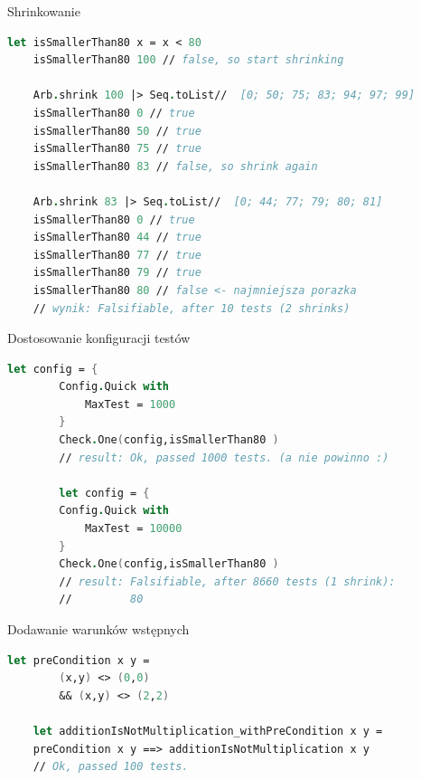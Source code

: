     \begin{frame}[fragile]{Shrinkowanie}
        \begin{lstlisting}[language=FSharp, xleftmargin=-10pt,xrightmargin=-10pt,numbers=none,basicstyle=\ttfamily\small]
    let isSmallerThan80 x = x < 80
    isSmallerThan80 100 // false, so start shrinking

    Arb.shrink 100 |> Seq.toList//  [0; 50; 75; 83; 94; 97; 99]
    isSmallerThan80 0 // true
    isSmallerThan80 50 // true
    isSmallerThan80 75 // true
    isSmallerThan80 83 // false, so shrink again

    Arb.shrink 83 |> Seq.toList//  [0; 44; 77; 79; 80; 81]
    isSmallerThan80 0 // true
    isSmallerThan80 44 // true
    isSmallerThan80 77 // true
    isSmallerThan80 79 // true
    isSmallerThan80 80 // false <- najmniejsza porazka
    // wynik: Falsifiable, after 10 tests (2 shrinks)
        \end{lstlisting}
    \end{frame}
    
    \begin{frame}[fragile]{Dostosowanie konfiguracji testów}
    \begin{lstlisting}[language=FSharp, xleftmargin=-10pt,xrightmargin=-10pt,numbers=none]
    let config = {
        Config.Quick with
            MaxTest = 1000
        }
        Check.One(config,isSmallerThan80 )
        // result: Ok, passed 1000 tests. (a nie powinno :)
        
        let config = {
        Config.Quick with
            MaxTest = 10000
        }
        Check.One(config,isSmallerThan80 )
        // result: Falsifiable, after 8660 tests (1 shrink):
        //         80
    \end{lstlisting}
    \end{frame}
    
    \begin{frame}[fragile]{Dodawanie warunków wstępnych}
    \begin{lstlisting}[language=FSharp, xleftmargin=-10pt,xrightmargin=-10pt,numbers=none]
    let preCondition x y =
        (x,y) <> (0,0)
        && (x,y) <> (2,2)

    let additionIsNotMultiplication_withPreCondition x y =
    preCondition x y ==> additionIsNotMultiplication x y
    // Ok, passed 100 tests.
    \end{lstlisting}
    \end{frame}
    
